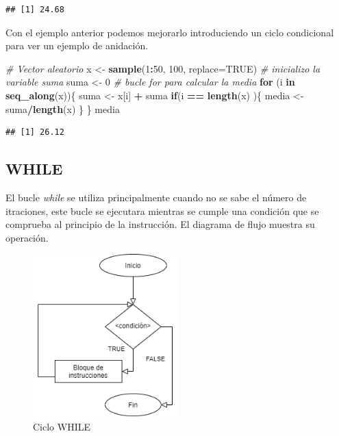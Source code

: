 \documentclass[11pt,]{article}
\newenvironment{Shaded}{\begin{snugshade}}{\end{snugshade}}
\newcommand{\CommentTok}[1]{\textcolor[rgb]{0.56,0.35,0.01}{\textit{#1}}}
\newcommand{\ControlFlowTok}[1]{\textcolor[rgb]{0.13,0.29,0.53}{\textbf{#1}}}
\newcommand{\DataTypeTok}[1]{\textcolor[rgb]{0.13,0.29,0.53}{#1}}
\newcommand{\DecValTok}[1]{\textcolor[rgb]{0.00,0.00,0.81}{#1}}
\newcommand{\KeywordTok}[1]{\textcolor[rgb]{0.13,0.29,0.53}{\textbf{#1}}}
\newcommand{\NormalTok}[1]{#1}
\newcommand{\OperatorTok}[1]{\textcolor[rgb]{0.81,0.36,0.00}{\textbf{#1}}}
\newcommand{\OtherTok}[1]{\textcolor[rgb]{0.56,0.35,0.01}{#1}}
\newcommand{\StringTok}[1]{\textcolor[rgb]{0.31,0.60,0.02}{#1}}
\begin{document}
\begin{verbatim}
## [1] 24.68
\end{verbatim}

Con el ejemplo anterior podemos mejorarlo introduciendo un ciclo
condicional para ver un ejemplo de anidación.

\begin{Shaded}
\begin{Highlighting}[]
\CommentTok{# Vector aleatorio}
\NormalTok{x <-}\StringTok{ }\KeywordTok{sample}\NormalTok{(}\DecValTok{1}\OperatorTok{:}\DecValTok{50}\NormalTok{, }\DecValTok{100}\NormalTok{, }\DataTypeTok{replace=}\OtherTok{TRUE}\NormalTok{)}
\CommentTok{# inicializo la variable suma}
\NormalTok{suma <-}\StringTok{ }\DecValTok{0}
\CommentTok{# bucle for para calcular la media}
\ControlFlowTok{for}\NormalTok{ (i }\ControlFlowTok{in} \KeywordTok{seq_along}\NormalTok{(x))\{}
\NormalTok{  suma <-}\StringTok{ }\NormalTok{x[i] }\OperatorTok{+}\StringTok{ }\NormalTok{suma}
  \ControlFlowTok{if}\NormalTok{(i }\OperatorTok{==}\StringTok{ }\KeywordTok{length}\NormalTok{(x) )\{}
\NormalTok{    media <-}\StringTok{ }\NormalTok{suma}\OperatorTok{/}\KeywordTok{length}\NormalTok{(x)}
\NormalTok{  \}}
\NormalTok{\}}
\NormalTok{media}
\end{Highlighting}
\end{Shaded}

\begin{verbatim}
## [1] 26.12
\end{verbatim}

\hypertarget{while}{%
\subsection{WHILE}\label{while}}

El bucle \emph{while} se utiliza principalmente cuando no se sabe el
número de itraciones, este bucle se ejecutara mientras se cumple una
condición que se comprueba al principio de la instrucción. El diagrama
de flujo muestra su operación.

\begin{figure}
\hypertarget{id}{%
\centering
\includegraphics[width=0.5\textwidth,height=0.3\textheight]{../schemas/WHILE.png}
\caption{Ciclo WHILE}\label{id}
}
\end{figure}
\end{document}
